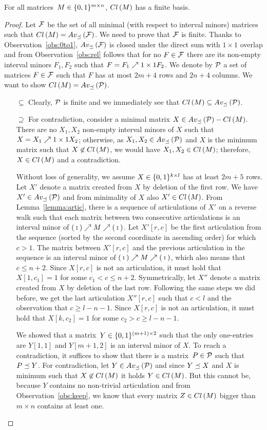 \begin{thm}
For all matrices~$M\in\{0,1\}^{m\times n}$, $Cl\left(M\right)$ has a finite basis.
\end{thm}
\begin{proof}
Let $\mathcal{F}$ be the set of all minimal (with respect to interval minors) matrices such that $Cl\left(M\right)=Av_{\preceq}\left(\mathcal{F}\right)$. We need to prove that $\mathcal{F}$ is finite. Thanks to Observation~\ref{obs:0to1}, $Av_{\preceq}\left(\mathcal{F}\right)$ is closed under the direct sum with $1\times1$ overlap and from Observation~\ref{obs:rel} follows that for no $F\in\mathcal{F}$ there are its non-empty interval minors $F_1,F_2$ such that $F=F_1\nearrow{1\times1}F_2$. We denote by $\mathcal{P}$ a set of matrices $F\in\mathcal{F}$ such that $F$ has at most $2m+4$ rows and $2n+4$ columns. We want to show $Cl\left(M\right)=Av_{\preceq}\left(\mathcal{P}\right)$.
\begin{itemize}
	\item[$\subseteq$] Clearly, $\mathcal{P}$ is finite and we immediately see that $Cl\left(M\right)\subseteq Av_{\preceq}\left(\mathcal{P}\right)$.
	\item[$\supseteq$] For contradiction, consider a minimal matrix $X\in Av_{\preceq}\left(\mathcal{P}\right)-Cl\left(M\right)$.
There are no $X_1,X_2$ non-empty interval minors of $X$ such that $X=X_1\nearrow{1\times1}X_2$; otherwise, as $X_1,X_2\in Av_{\preceq}\left(\mathcal{P}\right)$ and $X$ is the minimum matrix such that $X\not\in Cl\left(M\right)$, we would have $X_1,X_2\in Cl\left(M\right)$; therefore, $X\in Cl\left(M\right)$ and a contradiction.

Without loss of generality, we assume $X\in\{0,1\}^{k\times l}$ has at least $2m+5$ rows. Let $X'$ denote a matrix created from $X$ by deletion of the first row. We have $X'\in Av_{\preceq}\left(\mathcal{P}\right)$ and from minimality of $X$ also $X'\in Cl\left(M\right)$. From Lemma~\ref{lemma:artic}, there is a sequence of articulations of $X'$ on a reverse walk such that each matrix between two consecutive articulations is an interval minor of $\left(\begin{smallmatrix}1\end{smallmatrix}\right)\nearrow M\nearrow\left(\begin{smallmatrix}1\end{smallmatrix}\right)$. Let $X'[r,c]$ be the first articulation from the sequence (sorted by the second coordinate in ascending order) for which $c>1$. The matrix between $X'[r,c]$ and the previous articulation in the sequence is an interval minor of $\left(\begin{smallmatrix}1\end{smallmatrix}\right)\nearrow M\nearrow\left(\begin{smallmatrix}1\end{smallmatrix}\right)$, which also means that $c\leq n+2$. Since $X[r,c]$ is not an articulation, it must hold that $X[1,c_1]=1$ for some $c_1<c\leq n+2$. Symmetrically, let $X''$ denote a matrix created from $X$ by deletion of the last row. Following the same steps we did before, we get the last articulation $X''[r,c]$ such that $c<l$ and the observation that $c\geq l-n-1$. Since $X[r,c]$ is not an articulation, it must hold that $X[k,c_2]=1$ for some $c_2>c\geq l-n-1$.

We showed that a matrix~$Y\in\{0,1\}^{(m+1)\times2}$ such that the only one-entries are $Y[1,1]$ and $Y[m+1,2]$ is an interval minor of $X$. To reach a contradiction, it suffices to show that there is a matrix~$P\in\mathcal{P}$ such that $P\preceq Y$. For contradiction, let $Y\in Av_{\preceq}\left(\mathcal{P}\right)$ and since $Y\preceq X$ and $X$ is minimum such that $X\not\in Cl\left(M\right)$ it holds $Y\in Cl\left(M\right)$. But this cannot be, because $Y$ contains no non-trivial articulation and from Observation~\ref{obs:keep}, we know that every matrix $Z\in Cl\left(M\right)$ bigger than $m\times n$ contains at least one. \qedhere
\end{itemize}
\end{proof}

